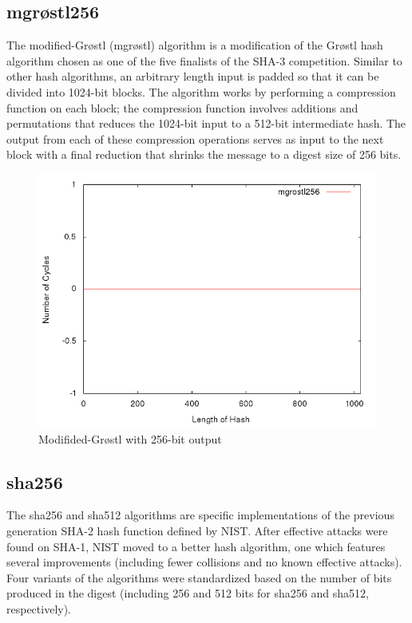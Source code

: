 \documentclass[10pt,a4paper]{article}
\begin{document}
\subsection{mgr{\o}stl256}
The modified-Gr{\o}stl (mgr{\o}stl) algorithm is a modification of the Gr{\o}stl hash algorithm chosen as one of the five finalists of the SHA-3 competition.  Similar to other hash algorithms, an arbitrary length input is padded so that it can be divided into 1024-bit blocks.  The algorithm works by performing a compression function on each block; the compression function involves additions and permutations that reduces the 1024-bit input to a 512-bit intermediate hash.  The output from each of these compression operations serves as input to the next block with a final reduction that shrinks the message to a digest size of 256 bits. 

    \begin{figure}[H]
        \begin{center}
            \includegraphics[scale=0.5]{images/mgrostl256.png} 
            \caption{Modifided-Gr{\o}stl with 256-bit output}
        \end{center}
    \end{figure}

\subsection{sha256}
The sha256 and sha512 algorithms are specific implementations of the previous generation SHA-2 hash function defined by NIST.  After effective attacks were found on SHA-1, NIST moved to a better hash algorithm, one which features several improvements (including fewer collisions and no known effective attacks).  Four variants of the algorithms were standardized based on the number of bits produced in the digest (including 256 and 512 bits for sha256 and sha512, respectively).
\end{document}

